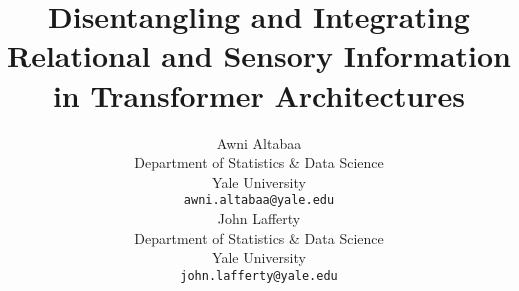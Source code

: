 \documentclass{article}
\title{Disentangling and Integrating Relational and Sensory Information in Transformer Architectures}
\author{%
  Awni Altabaa\\ %
  Department of Statistics \& Data Science\\
  Yale University\\
  \texttt{awni.altabaa@yale.edu} \\
  \And
  John Lafferty \\
  Department of Statistics \& Data Science \\
  Yale University \\
  \texttt{john.lafferty@yale.edu}
}
\begin{document}
\maketitle

















\printbibliography


\listoffixmes

\clearpage
\newpage


\appendix









\clearpage
\newpage

\end{document}
